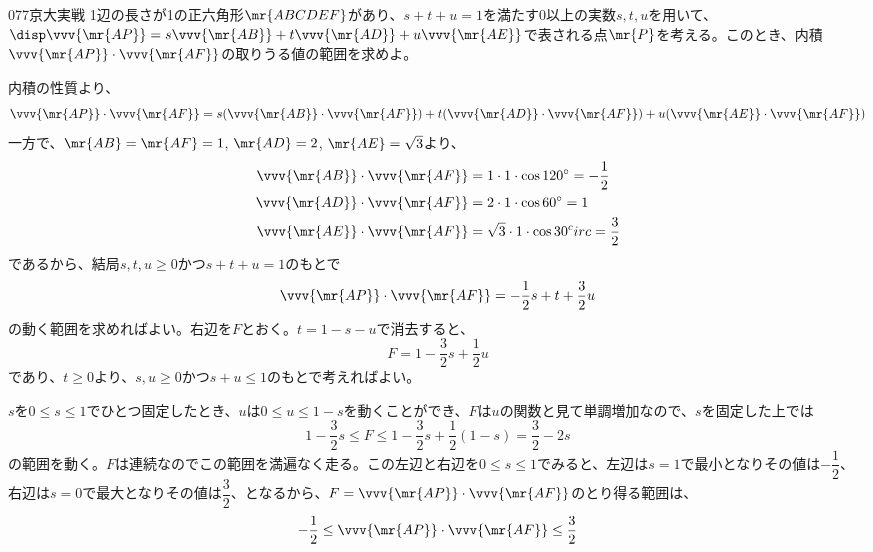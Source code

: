 \begin{prob}{077}{}{京大実戦}
 1辺の長さが1の正六角形$\mr{ABCDEF}$があり、$s+t+u=1$を満たす0以上の実数$s, t, u$を用いて、$\disp \vvv{\mr{AP}}=s\vvv{\mr{AB}}+t\vvv{\mr{AD}}+u\vvv{\mr{AE}}$で表される点$\mr{P}$を考える。このとき、内積$\vvv{\mr{AP}}\cdot\vvv{\mr{AF}}$の取りうる値の範囲を求めよ。
\end{prob}
内積の性質より、
\[ \vvv{\mr{AP}}\cdot\vvv{\mr{AF}}=s(\vvv{\mr{AB}}\cdot\vvv{\mr{AF}})+t(\vvv{\mr{AD}}\cdot\vvv{\mr{AF}})+u(\vvv{\mr{AE}}\cdot\vvv{\mr{AF}}) \]
一方で、$\mr{AB}=\mr{AF}=1$, $\mr{AD}=2$, $\mr{AE}=\sqrt{3}$より、
\begin{align*}
 \vvv{\mr{AB}}\cdot\vvv{\mr{AF}}&=1\cdot 1\cdot \cos 120^\circ=-\frac{1}{2} \\
 \vvv{\mr{AD}}\cdot\vvv{\mr{AF}}&=2\cdot 1\cdot \cos 60^\circ=1 \\
 \vvv{\mr{AE}}\cdot\vvv{\mr{AF}}&=\sqrt{3}\cdot 1\cdot \cos 30^circ=\frac{3}{2}
\end{align*}
であるから、結局$s, t, u\ge 0$かつ$s+t+u=1$のもとで
\[ \vvv{\mr{AP}}\cdot\vvv{\mr{AF}}=-\frac{1}{2}s+t+\frac{3}{2}u \]
の動く範囲を求めればよい。右辺を$F$とおく。$t=1-s-u$で消去すると、
\[ F=1-\frac{3}{2}s+\frac{1}{2}u \]
であり、$t\ge 0$より、$s, u\ge 0$かつ$s+u\le 1$のもとで考えればよい。

$s$を$0\le s\le 1$でひとつ固定したとき、$u$は$0\le u\le 1-s$を動くことができ、$F$は$u$の関数と見て単調増加なので、$s$を固定した上では
\[ 1-\frac{3}{2}s\le F\le 1-\frac{3}{2}s+\frac{1}{2}(1-s) = \frac{3}{2}-2s \]
の範囲を動く。$F$は連続なのでこの範囲を満遍なく走る。この左辺と右辺を$0\le s\le 1$でみると、左辺は$s=1$で最小となりその値は$-\dfrac{1}{2}$、右辺は$s=0$で最大となりその値は$\dfrac{3}{2}$、となるから、$F=\vvv{\mr{AP}}\cdot\vvv{\mr{AF}}$のとり得る範囲は、
\[ -\frac{1}{2}\le \vvv{\mr{AP}}\cdot\vvv{\mr{AF}}\le \frac{3}{2} \]